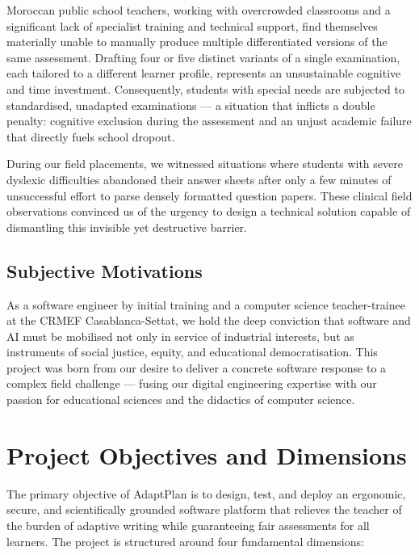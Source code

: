 \documentclass[12pt,a4paper]{report}
\begin{document}
Moroccan public school teachers, working with overcrowded classrooms and a significant lack of specialist training and technical support, find themselves materially unable to manually produce multiple differentiated versions of the same assessment. Drafting four or five distinct variants of a single examination, each tailored to a different learner profile, represents an unsustainable cognitive and time investment. Consequently, students with special needs are subjected to standardised, unadapted examinations — a situation that inflicts a double penalty: cognitive exclusion during the assessment and an unjust academic failure that directly fuels school dropout.

During our field placements, we witnessed situations where students with severe dyslexic difficulties abandoned their answer sheets after only a few minutes of unsuccessful effort to parse densely formatted question papers. These clinical field observations convinced us of the urgency to design a technical solution capable of dismantling this invisible yet destructive barrier.

\subsection{Subjective Motivations}

As a software engineer by initial training and a computer science teacher-trainee at the CRMEF Casablanca-Settat, we hold the deep conviction that software and AI must be mobilised not only in service of industrial interests, but as instruments of social justice, equity, and educational democratisation. This project was born from our desire to deliver a concrete software response to a complex field challenge — fusing our digital engineering expertise with our passion for educational sciences and the didactics of computer science.

\section{Project Objectives and Dimensions}

The primary objective of AdaptPlan is to design, test, and deploy an ergonomic, secure, and scientifically grounded software platform that relieves the teacher of the burden of adaptive writing while guaranteeing fair assessments for all learners. The project is structured around four fundamental dimensions:
\end{document}
